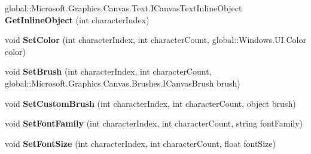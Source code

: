 \begin{DoxyCompactItemize}
\item 
\mbox{\label{interface_microsoft_1_1_graphics_1_1_canvas_1_1_text_1_1_i_canvas_text_layout_adbed17232322b4f7cb159ed09f3ed328}} 
global\+::\+Microsoft.\+Graphics.\+Canvas.\+Text.\+I\+Canvas\+Text\+Inline\+Object {\bfseries Get\+Inline\+Object} (int character\+Index)
\item 
\mbox{\label{interface_microsoft_1_1_graphics_1_1_canvas_1_1_text_1_1_i_canvas_text_layout_abf05e047c6100a7211eb7e3412bb3762}} 
void {\bfseries Set\+Color} (int character\+Index, int character\+Count, global\+::\+Windows.\+U\+I.\+Color color)
\item 
\mbox{\label{interface_microsoft_1_1_graphics_1_1_canvas_1_1_text_1_1_i_canvas_text_layout_a7f915acfc4ff40f7d367cb38220d6cbd}} 
void {\bfseries Set\+Brush} (int character\+Index, int character\+Count, global\+::\+Microsoft.\+Graphics.\+Canvas.\+Brushes.\+I\+Canvas\+Brush brush)
\item 
\mbox{\label{interface_microsoft_1_1_graphics_1_1_canvas_1_1_text_1_1_i_canvas_text_layout_aeddfc3e7e513bcfa6c67e5a5139a3558}} 
void {\bfseries Set\+Custom\+Brush} (int character\+Index, int character\+Count, object brush)
\item 
\mbox{\label{interface_microsoft_1_1_graphics_1_1_canvas_1_1_text_1_1_i_canvas_text_layout_aa9cb4ef464927909fcb48d72a4703b8a}} 
void {\bfseries Set\+Font\+Family} (int character\+Index, int character\+Count, string font\+Family)
\item 
\mbox{\label{interface_microsoft_1_1_graphics_1_1_canvas_1_1_text_1_1_i_canvas_text_layout_a8b0dd44121dd43e004f96f5df2498994}} 
void {\bfseries Set\+Font\+Size} (int character\+Index, int character\+Count, float font\+Size)
\item 
\mbox{\label{interface_microsoft_1_1_graphics_1_1_canvas_1_1_text_1_1_i_canvas_text_layout_a516ffa415e1689e878df56a857176c9a}} 

\end{DoxyCompactItemize}
